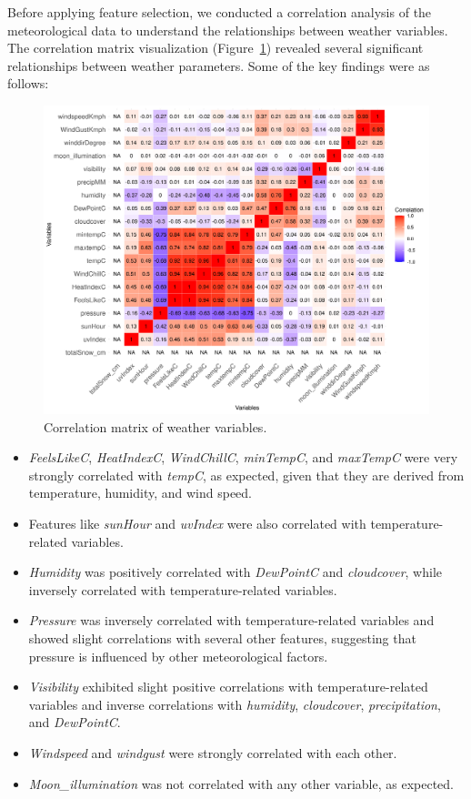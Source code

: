 \documentclass[twoside,11pt]{article}
\begin{document}
Before applying feature selection, we conducted a correlation analysis of the meteorological data to understand the relationships between weather variables. The correlation matrix visualization (Figure~\ref{fig:correlation_matrix}) revealed several significant relationships between weather parameters. Some of the key findings were as follows:

\begin{figure}[H]
  \centering
  \includegraphics[width=\textwidth]{assets/feature-correlation-matrix.png}
  \caption{Correlation matrix of weather variables.}
  \label{fig:correlation_matrix}
\end{figure}

\begin{itemize}
    \item \textit{FeelsLikeC}, \textit{HeatIndexC}, \textit{WindChillC}, \textit{minTempC}, and \textit{maxTempC} were very strongly correlated with \textit{tempC}, as expected, given that they are derived from temperature, humidity, and wind speed.
    \item Features like \textit{sunHour} and \textit{uvIndex} were also correlated with temperature-related variables.
    \item \textit{Humidity} was positively correlated with \textit{DewPointC} and \textit{cloudcover}, while inversely correlated with temperature-related variables.
    \item \textit{Pressure} was inversely correlated with temperature-related variables and showed slight correlations with several other features, suggesting that pressure is influenced by other meteorological factors.
    \item \textit{Visibility} exhibited slight positive correlations with temperature-related variables and inverse correlations with \textit{humidity}, \textit{cloudcover}, \textit{precipitation}, and \textit{DewPointC}.
    \item \textit{Windspeed} and \textit{windgust} were strongly correlated with each other.
    \item \textit{Moon\_illumination} was not correlated with any other variable, as expected.
\end{itemize}
\end{document}
